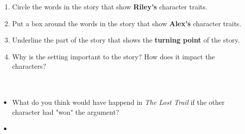 \documentclass[12pt]{article}
\begin{document}
\begin{tcolorbox}[colframe=black!60, colback=white, 
coltitle=black, colbacktitle=black!15, fonttitle=\bfseries\Large, 
title=Independent Practice, halign title=center, left=10pt, right=10pt, top=10pt, bottom=15pt]
\begin{enumerate}[itemsep=1em]
    \item Circle the words in the story that show \textbf{Riley's} character traits.
    \item Put a box around the words in the story that show \textbf{Alex's} character traits.
    \item Underline the part of the story that shows the \textbf{turning point} of the story.
    \item Why is the setting important to the story? How does it impact the characters?
    \\[0.8cm] \underline{\hspace{14cm}}  
    \\[0.8cm] \underline{\hspace{14cm}}  
    \\[0.8cm] \underline{\hspace{14cm}} 
\end{enumerate}
\end{tcolorbox}

\vspace{1em}

\begin{tcolorbox}[colframe=black!60, colback=white, 
coltitle=black, colbacktitle=black!15, fonttitle=\bfseries\Large, 
title=Exit Ticket, halign title=center, left=10pt, right=10pt, top=10pt, bottom=15pt]
\begin{itemize}
    \item What do you think would have happend in \textit{The Lost Trail} if the other character had "won" the argument?
    \item \vspace{8cm}
\end{itemize}
\end{tcolorbox}
\end{document}
